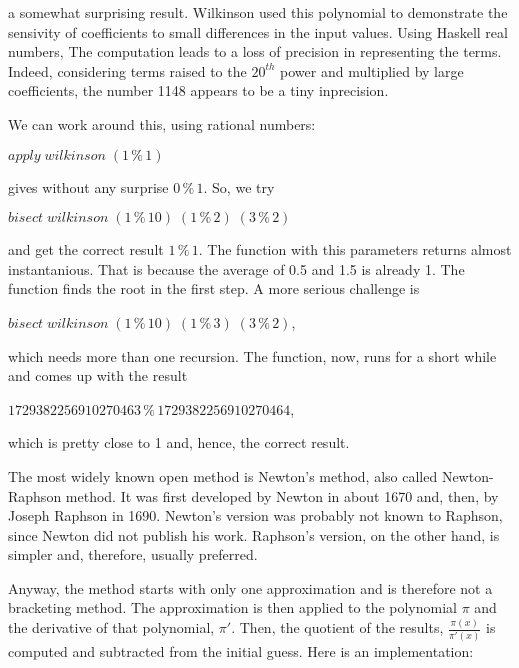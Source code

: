 \documentclass[tikz]{scrreprt}
\newcommand{\Varid}[1]{\mathit{#1}}
\begin{document}
a somewhat surprising result.
Wilkinson used this polynomial to demonstrate
the sensivity of coefficients to small differences
in the input values. Using Haskell real numbers,
The computation leads to a loss of precision
in representing the terms. Indeed, considering
terms raised to the $20^{th}$ power and multiplied
by large coefficients, the number 1148 appears to
be a tiny inprecision.

We can work around this, using rational numbers:

\ensuremath{\Varid{apply}\;\Varid{wilkinson}\;(\mathrm{1}\mathbin{\%}\mathrm{1})}

gives without any surprise \ensuremath{\mathrm{0}\mathbin{\%}\mathrm{1}}.
So, we try

\ensuremath{\Varid{bisect}\;\Varid{wilkinson}\;(\mathrm{1}\mathbin{\%}\mathrm{10})\;(\mathrm{1}\mathbin{\%}\mathrm{2})\;(\mathrm{3}\mathbin{\%}\mathrm{2})}

and get the correct result \ensuremath{\mathrm{1}\mathbin{\%}\mathrm{1}}.
The function with this parameters
returns almost instantanious. That is
because the average of 0.5 and 1.5 is already 1.
The function finds the root in the first step.
A more serious challenge is

\ensuremath{\Varid{bisect}\;\Varid{wilkinson}\;(\mathrm{1}\mathbin{\%}\mathrm{10})\;(\mathrm{1}\mathbin{\%}\mathrm{3})\;(\mathrm{3}\mathbin{\%}\mathrm{2})},

which needs more than one recursion.
The function, now, runs for a short while and
comes up with the result

\ensuremath{\mathrm{1729382256910270463}\mathbin{\%}\mathrm{1729382256910270464}},

which is pretty close to 1 and, hence,
the correct result.

The most widely known open method is Newton's method,
also called Newton-Raphson method.
It was first developed by Newton in about 1670
and, then, by Joseph Raphson in 1690.
Newton's version was probably not known to Raphson,
since Newton did not publish his work.
Raphson's version, on the other hand, is
simpler and, therefore, usually preferred.

Anyway, the method starts with only one approximation
and is therefore not a bracketing method.
The approximation is then applied to the polynomial $\pi$
and the derivative of that polynomial, $\pi'$.
Then, the quotient of the results, $\frac{\pi(x)}{\pi'(x)}$ 
is computed and subtracted from the initial guess.
Here is an implementation:
\end{document}
